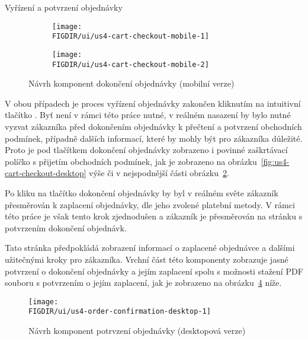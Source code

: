 \begin{subsection}{Vyřízení a potvrzení objednávky}
    \begin{figure}[H]
        \centering
        \begin{subfigure}{0.4\textwidth}
            \texttt{[image: \\FIGDIR/ui/us4-cart-checkout-mobile-1]}
            \label{fig:us4-cart-checkout-mobile-1}
        \end{subfigure}
        \hfill
        \begin{subfigure}{0.4\textwidth}
            \texttt{[image: \\FIGDIR/ui/us4-cart-checkout-mobile-2]}
            \label{fig:us4-cart-checkout-mobile-2}
        \end{subfigure}

        \caption{Návrh komponent dokončení objednávky (mobilní verze)}
        \label{fig:us4-cart-checkout-mobile}
    \end{figure}

    V obou případech je proces vyřízení objednávky zakončen kliknutím na intuitivní tlačítko .
    Byť není v rámci této práce nutné, v reálném nasazení by bylo nutné vyzvat zákazníka před dokončením objednávky k přečtení a potvrzení obchodních podmínek, případně dalších informací, které by mohly být pro zákazníka důležité.
    Proto je pod tlačítkem dokončení objednávky zobrazeno i povinné zaškrtávací políčko s přijetím obchodních podmínek, jak je zobrazeno na obrázku~\ref{fig:us4-cart-checkout-desktop} výše či v nejspodnější části obrázku~\ref{fig:us4-cart-checkout-mobile-2}.

    Po kliku na tlačítko dokončení objednávky by byl v reálném světe zákazník přesměrován k zaplacení objednávky, dle jeho zvolené platební metody.
    V rámci této práce je však tento krok zjednodušen a zákazník je přesměrován na stránku s potvrzením dokončení objednávk.

    Tato stránka předpokládá zobrazení informací o zaplacené objednávce a dalšími užitečnými kroky pro zákazníka.
    Vrchní část této komponenty zobrazuje jasné potvrzení o dokončení objednávky a jejím zaplacení spolu s možnosti stažení PDF souboru s potvrzením o jejím zaplacení, jak je zobrazeno na obrázku~\ref{fig:us4-order-confirmation-desktop} níže.

    \begin{figure}[H]
        \centering
        \texttt{[image: \\FIGDIR/ui/us4-order-confirmation-desktop-1]}
        \caption{Návrh komponent potrvzení objednávky (desktopová verze)}
        \label{fig:us4-order-confirmation-desktop}
    \end{figure}


\end{subsection}
